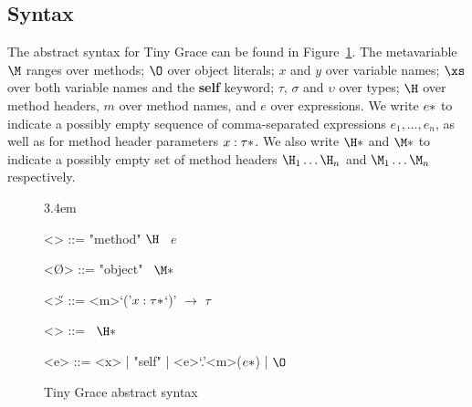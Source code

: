 \subsection{Syntax}

The abstract syntax for Tiny Grace can be found in
Figure~\ref{fig:abstract-syntax}.  The metavariable $\M$ ranges over methods;
$\O$ over object literals; $x$ and $y$ over variable names; $\xs$ over both
variable names and the {\sffamily\bfseries self} keyword; $\tau$, $\sigma$ and
$\upsilon$ over types; $\H$ over method headers, $m$ over method names, and $e$
over expressions.  We write $\*e*$ to indicate a possibly empty sequence of
comma-separated expressions $e_1, \dots, e_n$, as well as for method header
parameters $\*x : \tau*$.  We also write $\*\H*$ and $\*\M*$ to indicate a
possibly empty set of method headers $\H_1 \dots \H_n$ and $\M_1 \dots \M_n$
respectively.

\begin{figure}
\centering

\grammarindent3.4em
\renewcommand{\grammarlabel}[2]{$#1$\hfill#2}
\renewcommand{\syntleft}{\itshape}
\renewcommand{\syntright}{}
\renewcommand{\ulitleft}{\sffamily\bfseries}
\renewcommand{\litleft}{\sffamily}
\renewcommand{\litright}{}

\begin{grammar}
<\M> ::= "method" $\H$ \bo~$e$ \bc

<\O> ::= "object" \bo~$\*\M*$ \bc

<\H> ::= <m>`('$\*x : \tau*$`)' $\to$ $\tau$

<\tau> ::= \bo~$\*\H*$ \bc

<e> ::= <x> | "self" | <e>`.'<m>($\*e*$) | $\O$
\end{grammar}

\caption{Tiny Grace abstract syntax}
\label{fig:abstract-syntax}

\end{figure}

